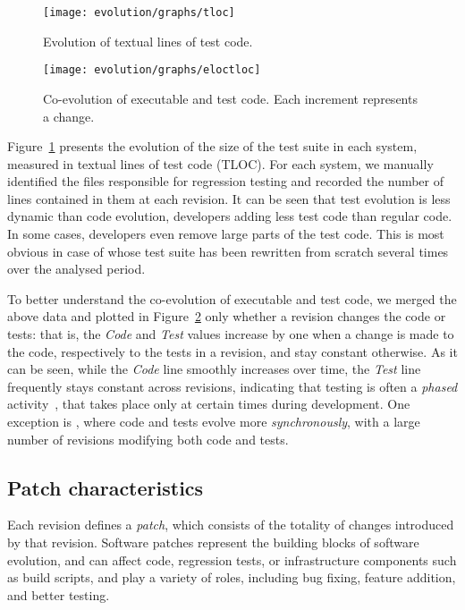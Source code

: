 \begin{figure}[t]
\centering
\texttt{[image: evolution/graphs/tloc]}
\caption{Evolution of textual lines of test code.}
\label{fig:tloc-evol}
\end{figure}


\begin{figure}[t]
\centering
\texttt{[image: evolution/graphs/eloctloc]}
\caption{Co-evolution of executable and test code. Each increment represents a change.}
\label{fig:coeloctloc}
\end{figure}


Figure~\ref{fig:tloc-evol} presents the evolution of the size of the test suite
in each system, measured in textual lines of test code (TLOC).  For each
system, we manually identified the files responsible for regression testing and
recorded the number of lines contained in them at each revision. It can be seen
that test evolution is less dynamic than code evolution, developers adding less
test code than regular code. In some cases, developers even remove large parts
of the test code. This is most obvious in case of \beanstalkd whose test suite
has been rewritten from scratch several times over the analysed period.


To better understand the co-evolution of executable and test code, we
merged the above data and plotted in Figure~\ref{fig:coeloctloc}
only whether a revision changes the code or tests: that is,
the \emph{Code} and \emph{Test} values increase by one when a change is
made to the code, respectively to the tests in a revision, and stay constant
otherwise.  As it can be seen, while the \emph{Code} line smoothly
increases over time, the \emph{Test} line frequently stays constant
across revisions, indicating that testing is often a \textit{phased}
activity~\cite{coevol:emse11}, that takes place only at certain times
during development. One exception is \git, where code and
tests evolve more \textit{synchronously}, with a large number of
revisions modifying both code and tests.

\subsection{Patch characteristics}


Each revision defines a \textit{patch}, which consists of the totality
of changes introduced by that revision.  Software patches represent
the building blocks of software evolution, and 
can affect code, regression tests, or infrastructure components such
as build scripts, and play a variety of roles, including bug fixing,
feature addition, and better testing.  

